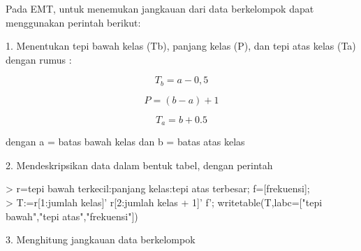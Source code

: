 \documentclass[a4paper,10pt]{article}
\begin{document}
\begin{eulernotebook}
\begin{eulercomment}
\begin{eulercomment}
\begin{eulercomment}
\begin{eulercomment}
\begin{eulercomment}
\begin{eulercomment}
\begin{eulercomment}
\begin{eulercomment}
\begin{eulercomment}
\begin{eulercomment}
\begin{eulercomment}
\begin{eulercomment}
\begin{eulercomment}
Pada EMT,  untuk menemukan jangkauan dari data berkelompok dapat
menggunakan perintah berikut:

1. Menentukan tepi bawah kelas (Tb), panjang kelas (P), dan tepi atas
kelas (Ta) dengan rumus :

\end{eulercomment}
\begin{eulerformula}
\[
T_b=a-0,5
\]
\end{eulerformula}
\begin{eulerformula}
\[
P=(b-a)+1
\]
\end{eulerformula}
\begin{eulerformula}
\[
T_a=b+0.5
\]
\end{eulerformula}
\begin{eulercomment}
dengan a = batas bawah kelas dan b = batas atas kelas

2. Mendeskripsikan data dalam bentuk tabel, dengan perintah

\textgreater{} r=tepi bawah terkecil:panjang kelas:tepi atas terbesar;
f=[frekuensi];\\
\textgreater{} T:=r[1:jumlah kelas]' \textbar{} r[2:jumlah kelas + 1]' \textbar{} f';
writetable(T,labc=["tepi bawah","tepi atas","frekuensi"])

3. Menghitung jangkauan data berkelompok


\end{eulercomment}
\end{eulercomment}
\end{eulercomment}
\end{eulercomment}
\end{eulercomment}
\end{eulercomment}
\end{eulercomment}
\end{eulercomment}
\end{eulercomment}
\end{eulercomment}
\end{eulercomment}
\end{eulercomment}
\end{eulercomment}
\end{eulernotebook}
\end{document}
